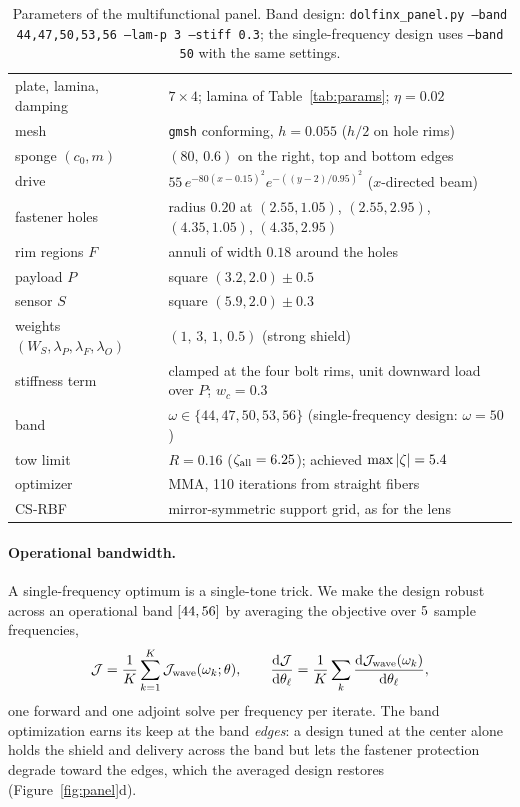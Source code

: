 \begin{table}[!tbp]
\centering\footnotesize
\caption{Parameters of the multifunctional panel. Band design:
\texttt{dolfinx\_panel.py --band 44,47,50,53,56 --lam-p 3 --stiff 0.3}; the single-frequency
design uses \texttt{--band 50} with the same settings.}\label{tab:panelparams}
\begin{tabular}{@{}ll@{}}
\toprule
plate, lamina, damping & $7\times4$; lamina of Table~\ref{tab:params}; $\eta=0.02$\\
mesh & \texttt{gmsh} conforming, $h=0.055$ ($h/2$ on hole rims)\\
sponge $(c_0,m)$ & $(80,\,0.6)$ on the right, top and bottom edges\\
drive & $55\,e^{-80(x-0.15)^2}e^{-((y-2)/0.95)^2}$ ($x$-directed beam)\\
fastener holes & radius $0.20$ at $(2.55,1.05)$, $(2.55,2.95)$, $(4.35,1.05)$, $(4.35,2.95)$\\
rim regions $F$ & annuli of width $0.18$ around the holes\\
payload $P$ & square $(3.2,2.0)\pm0.5$\\
sensor $S$ & square $(5.9,2.0)\pm0.3$\\
weights $(W_S,\lambda_P,\lambda_F,\lambda_O)$ & $(1,\,3,\,1,\,0.5)$ (strong shield)\\
stiffness term & clamped at the four bolt rims, unit downward load over $P$; $w_c=0.3$\\
band & $\omega\in\{44,47,50,53,56\}$ (single-frequency design: $\omega=50$)\\
tow limit & $R=0.16$ ($\zeta_{\rm all}=6.25$); achieved $\max|\zeta|=5.4$\\
optimizer & MMA, 110 iterations from straight fibers\\
CS-RBF & mirror-symmetric support grid, as for the lens\\
\bottomrule
\end{tabular}
\end{table}

\paragraph{Operational bandwidth.}
A single-frequency optimum is a single-tone trick. We make the design robust across an
operational band $[44,56]$ by averaging the objective over $5$ sample
frequencies,
\begin{equation}
  \mathcal J=\frac1K\sum_{k=1}^{K}\mathcal J_{\rm wave}(\omega_k;\theta),\qquad
  \frac{\mathrm d\mathcal J}{\mathrm d\theta_\ell}
  =\frac1K\sum_k\frac{\mathrm d\mathcal J_{\rm wave}(\omega_k)}{\mathrm d\theta_\ell},
  \label{eq:panelband}
\end{equation}
one forward and one adjoint solve per frequency per iterate. The band optimization earns
its keep at the band \emph{edges}: a design tuned at the center alone holds the shield and
delivery across the band but lets the fastener protection degrade toward the edges, which
the averaged design restores (Figure~\ref{fig:panel}d).

